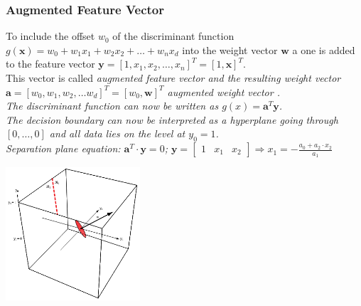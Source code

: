     
    \subsubsection{Augmented Feature Vector}
    \begin{minipage}{12cm}
      To include the offset $w_0$ of the discriminant function $g(\bm x) = w_0 + w_1 x_1 + w_2 x_2 + \ldots + w_n x_d$ into the weight vector $\bm w$ 
      a one is added to the feature vector  $\bm y = [1, x_1, x_2, \ldots, x_n]^T = [1, \bm x]^T$.\\
      This vector is called \em augmented feature vector \em and the resulting weight vector $\bm a = [w_0, w_1, w_2, \ldots w_d]^T = [w_0, \bm w]^T$  \em augmented
      weight vector \em. \\
      The discriminant function can now be written as $g(x) = \bm a^T \bm y$.\\
      The decision boundary can now be interpreted as a hyperplane going through $[0,\ldots,0]$ and 
      all data lies on the level at $y_0=1$.\\
      Separation plane equation: $\bm a^T \cdot \bm y = 0$;  $\bm y = \begin{bmatrix}1 & x_1& x_2\end{bmatrix} \Rightarrow x_1=-\frac{a_0 + a_2\cdot x_2}{a_1}$
    \end{minipage}
    \hspace{5mm}
    \begin{minipage}{5cm}
    	 \includegraphics[width=5cm]{./images/augmentedVector.png}
   
    \end{minipage}
   
    
    
    
